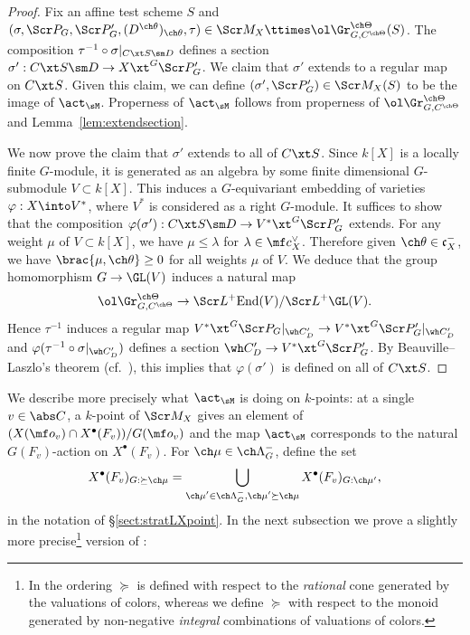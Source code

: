 \begin{proof}
Fix an affine test scheme $S$ and $(\sigma,\Scr P_G,\Scr P'_G, (D^{\ch\theta})_{\ch\theta},\tau) \in \Scr M_X \ttimes \ol\Gr^{\ch\Theta}_{G,C^{\ch\Theta}}(S)$.
The composition $\tau^{-1} \circ \sigma|_{C\xt S\sm D}$ defines
a section $\sigma' : C\xt S \sm D \to X\xt^G \Scr P'_G$.
We claim that $\sigma'$ extends to a regular map on $C\xt S$.
Given this claim, we can define $(\sigma',\Scr P'_G)\in \Scr M_X(S)$
to be the image of $\act_\sM$. Properness of $\act_\sM$
follows from properness of $\ol\Gr^{\ch\Theta}_{G,C^{\ch\Theta}}$
and Lemma~\ref{lem:extendsection}.

We now prove the claim that $\sigma'$ extends to all of $C\xt S$.
Since $k[X]$ is a locally finite $G$-module, it is generated as an
algebra by some finite dimensional $G$-submodule $V \subset k[X]$.
This induces a $G$-equivariant embedding of varieties $\varphi: X\into V^*$,
where $V^{*}$ is considered as a right $G$-module.
It suffices to show that the composition $\varphi(\sigma'):
C\xt S\sm D \to V^{*} \xt^G \Scr P'_G$ extends.
For any weight $\mu$ of $V \subset k[X]$, we have $\mu \le \lambda$ for $\lambda\in \mf c_X^\vee$.
Therefore given $\ch\theta\in \mathfrak c_X^-$, we have $\brac{\mu,\ch\theta}\ge 0$
for all weights $\mu$ of $V$.
We deduce that the group homomorphism $G \to \GL(V)$ induces a natural map
\[ \ol\Gr^{\ch\Theta}_{G,C^{\ch\Theta}} \to
\Scr L^+\mathrm{End}(V)/\Scr L^+\GL(V). \]
Hence $\tau^{-1}$ induces a regular map
$V^{*} \xt^G\Scr P_G|_{\wh C'_D} \to V^{*} \xt^G\Scr P'_G|_{\wh C'_D}$
and $\varphi(\tau^{-1}\circ \sigma|_{\wh C'_D})$ defines a section
$\wh C'_D \to V^{*} \xt^G \Scr P'_G$.
By Beauville--Laszlo's theorem (cf.~\cite[Theorem 2.12.1]{BD}),
this implies that $\varphi(\sigma')$ is defined on all of $C\xt S$.
\end{proof}


We describe more precisely what $\act_\sM$ is doing on $k$-points:
at a single $v \in \abs C$, a $k$-point of $\Scr M_X$ gives an element
of $(X(\mf o_v)\cap X^\bullet(F_v)) / G(\mf o_v)$ and the map $\act_\sM$ corresponds
to the natural $G(F_v)$-action on $X^\bullet(F_v)$.
For $\ch\mu \in \ch\Lambda^-_G$,
define the set
\[ X^\bullet(F_v)_{G:\succeq \ch\mu} = \bigcup_{\substack{\ch\mu' \in \ch\Lambda^-_G, \ch\mu' \succeq \ch\mu}} X^\bullet(F_v)_{G:\ch\mu'}, \]
in the notation of \S \ref{sect:stratLXpoint}.
In the next subsection we prove a slightly more precise\footnote{In \cite{SV}
the ordering $\succeq$ is defined with respect to the \emph{rational} cone generated by
the valuations of colors, whereas we define $\succeq$ with respect
to the monoid generated by non-negative \emph{integral} combinations of valuations of colors.}
version of \cite[Lemma 5.5.2]{SV}:

